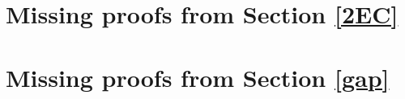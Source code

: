 \section{Missing proofs from Section \ref{2EC}}


\section{Missing proofs from Section \ref{gap}}


